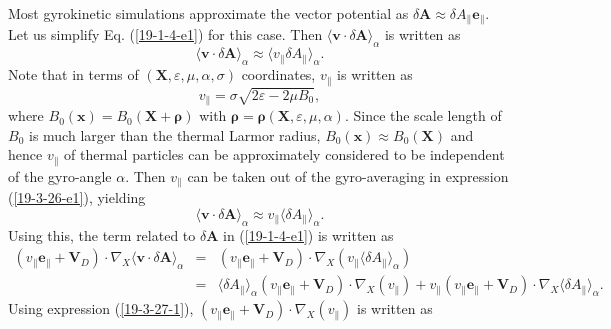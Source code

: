 \documentclass{llncs}
\newcommand{\tmmathbf}[1]{\ensuremath{\boldsymbol{#1}}}
\begin{document}
Most gyrokinetic simulations approximate the vector potential as $\delta
\mathbf{A} \approx \delta A_{\parallel} \mathbf{e}_{\parallel}$. Let us
simplify Eq. (\ref{19-1-4-e1}) for this case. Then $\langle \mathbf{v} \cdot
\delta \mathbf{A} \rangle_{\alpha}$ is written as
\begin{equation}
  \label{19-3-26-e1} \langle \mathbf{v} \cdot \delta \mathbf{A}
  \rangle_{\alpha} \approx \langle v_{\parallel} \delta A_{\parallel}
  \rangle_{\alpha} .
\end{equation}
Note that in terms of $(\mathbf{X}, \varepsilon, \mu, \alpha, \sigma)$
coordinates, $v_{\parallel}$ is written as
\begin{equation}
  \label{19-3-27-1} v_{\parallel} = \sigma \sqrt{2 \varepsilon - 2 \mu B_0},
\end{equation}
where $B_0 (\mathbf{x}) = B_0 (\mathbf{X}+\tmmathbf{\rho})$ with
$\tmmathbf{\rho}=\tmmathbf{\rho} (\mathbf{X}, \varepsilon, \mu, \alpha)$.
Since the scale length of $B_0$ is much larger than the thermal Larmor radius,
$B_0 (\mathbf{x}) \approx B_0 (\mathbf{X})$ and hence $v_{\parallel}$ of
thermal particles can be approximately considered to be independent of the
gyro-angle $\alpha$. Then $v_{\parallel}$ can be taken out of the
gyro-averaging in expression (\ref{19-3-26-e1}), yielding
\begin{equation}
  \langle \mathbf{v} \cdot \delta \mathbf{A} \rangle_{\alpha} \approx
  v_{\parallel} \langle \delta A_{\parallel} \rangle_{\alpha} .
\end{equation}
Using this, the term related to $\delta \mathbf{A}$ in (\ref{19-1-4-e1}) is
written as
\begin{eqnarray}
  (v_{\parallel} \mathbf{e}_{\parallel} +\mathbf{V}_D) \cdot \nabla_X \langle
  \mathbf{v} \cdot \delta \mathbf{A} \rangle_{\alpha} & = & (v_{\parallel}
  \mathbf{e}_{\parallel} +\mathbf{V}_D) \cdot \nabla_X (v_{\parallel} \langle
  \delta A_{\parallel} \rangle_{\alpha}) \nonumber\\
  & = & \langle \delta A_{\parallel} \rangle_{\alpha} (v_{\parallel}
  \mathbf{e}_{\parallel} +\mathbf{V}_D) \cdot \nabla_X (v_{\parallel}) +
  v_{\parallel} (v_{\parallel} \mathbf{e}_{\parallel} +\mathbf{V}_D) \cdot
  \nabla_X \langle \delta A_{\parallel} \rangle_{\alpha} . 
\end{eqnarray}
Using expression (\ref{19-3-27-1}), $(v_{\parallel} \mathbf{e}_{\parallel}
+\mathbf{V}_D) \cdot \nabla_X (v_{\parallel})$ is written as
\end{document}
